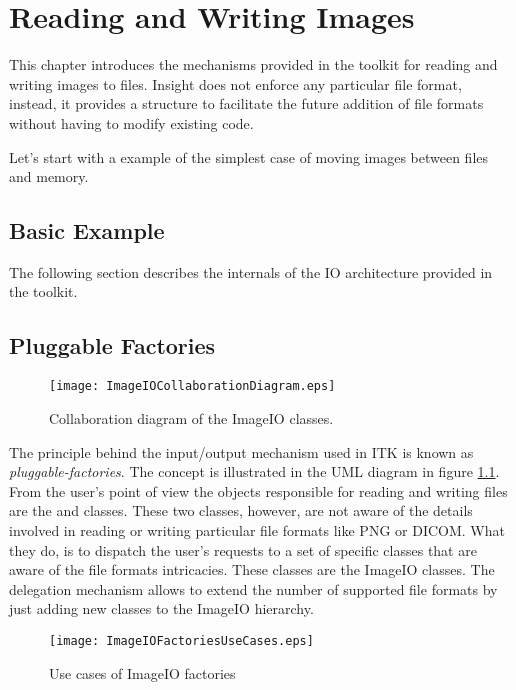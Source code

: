 

\chapter{Reading and Writing Images}
\label{sec:IO}

This chapter introduces the mechanisms provided in the toolkit for reading and
writing images to files. Insight does not enforce any particular file format,
instead, it provides a structure to facilitate the future addition of file
formats without having to modify existing code. 

Let's start with a example of the simplest case of moving images between files
and memory.

\section{Basic Example}
\label{sec:ImagReadWrite}



The following section describes the internals of the IO architecture provided
in the toolkit.

\section{Pluggable Factories}
\label{sec:ImageIOPluggableFactories}

\begin{figure}
\center
\texttt{[image: ImageIOCollaborationDiagram.eps]}
\caption{Collaboration diagram of the ImageIO classes.}
\label{fig:ImageIOCollaborationDiagram}
\end{figure}


The principle behind the input/output mechanism used in ITK is known as
\emph{pluggable-factories}\cite{Gamma1995}. The concept is illustrated in the
UML diagram in figure \ref{fig:ImageIOCollaborationDiagram}. From the user's
point of view the objects responsible for reading and writing files are the
 and  classes. These two
classes, however, are not aware of the details involved in reading or writing
particular file formats like PNG or DICOM.  What they do, is to dispatch the
user's requests to a set of specific classes that are aware of the file formats
intricacies. These classes are the ImageIO classes. The delegation mechanism
allows to extend the number of supported file formats by just adding new
classes to the ImageIO hierarchy.

\begin{figure}
\center
\texttt{[image: ImageIOFactoriesUseCases.eps]}
\caption{Use cases of ImageIO factories}
\label{fig:ImageIOFactoriesUseCases}
\end{figure}


